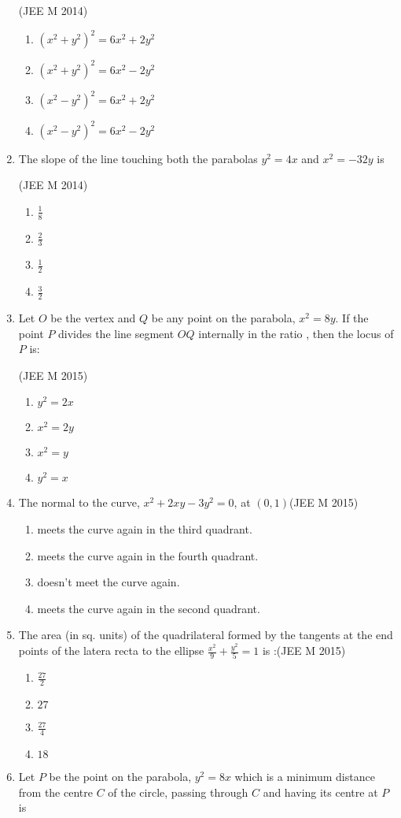 \documentclass[journal,12pt,twocolumn]{IEEEtran}
\theoremstyle{remark}
\begin{document}
\begin{enumerate}
\hfill(JEE M 2014)
\begin{enumerate}
    \item $(x^2+y^2)^2=6x^2+2y^2$
    \item $(x^2+y^2)^2=6x^2-2y^2$
    \item $(x^2-y^2)^2=6x^2+2y^2$
    \item $(x^2-y^2)^2=6x^2-2y^2$
\end{enumerate}
\item The slope of the line touching both the parabolas $y^2=4x$ and $x^2=-32y$ is

\hfill(JEE M 2014)
\begin{enumerate}
    \item $\frac{1}{8}$
    \item $\frac{2}{3}$
    \item $\frac{1}{2}$
    \item $\frac{3}{2}$
\end{enumerate}
\item Let $O$ be the vertex and $Q$ be any point on the parabola, $x^2=8y$. If the point $P$ divides the line segment $OQ$ internally in the ratio , then the locus of $P$ is:

\hfill(JEE M 2015)
\begin{enumerate}
    \item $y^2=2x$
    \item $x^2=2y$
    \item $x^2=y$
    \item $y^2=x$
\end{enumerate}
\item The normal to the curve, $x^2+2xy-3y^2=0$, at $(0,1)$\hfill(JEE M 2015)
\begin{enumerate}
    \item meets the curve again in the third quadrant.
    \item meets the curve again in the fourth quadrant.
    \item doesn't meet the curve again.
    \item meets the curve again in the second quadrant.
\end{enumerate}
\item The area (in sq. units) of the quadrilateral formed by the tangents at the end points of the latera recta to the ellipse $\frac{x^2}{9}+\frac{y^2}{5}=1$ is :\hfill(JEE M 2015)
\begin{enumerate}
    \item $\frac{27}{2}$
    \item $27$
    \item $\frac{27}{4}$
    \item $18$
\end{enumerate}
\item Let $P$ be the point on the parabola, $y^2=8x$ which is a minimum distance from the centre $C$ of the circle, passing through $C$ and having its centre at $P$ is


\end{enumerate}
\end{document}
